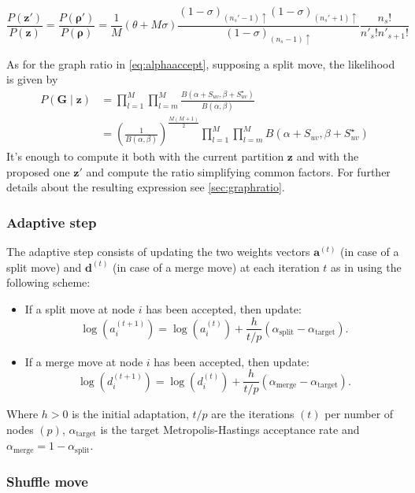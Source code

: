 \begin{equation*}
    \frac{P(\bm{z}')}{P(\bm{z})}
    =
    \frac{P(\bm{\rho}')}{P(\bm{\rho})}
    =
    \frac{1}{M}(\theta+M\sigma)\frac{(1-\sigma)_{(n_{s}'-1)\uparrow}(1-\sigma)_{(n_{s}'+1)\uparrow}}{(1-\sigma)_{(n_{s}-1)\uparrow}}\frac{n_{s}!}{n'_{s}!n'_{s+1}!}
\end{equation*}


As for the graph ratio in \eqref{eq:alphaaccept}, supposing a split move, the likelihood is given by
\begin{align*}
    P(\bm{G}\mid \bm{z}) &= \prod_{l=1}^M \prod_{l=m}^M \frac{B(\alpha+S_{uv},\beta+S^{\star}_{uv})}{B(\alpha,\beta)} \\
    &= \left(\frac{1}{B(\alpha,\beta)}\right)^\frac{M(M+1)}{2}\prod_{l=1}^M \prod_{l=m}^M B(\alpha+S_{uv},\beta+S^{\star}_{uv})
\end{align*}
It's enough to compute it both with the current partition $\bm{z}$ and with the proposed one $\bm{z}'$ and compute the ratio simplifying common factors. For further details about the resulting expression see \ref{sec:graphratio}.

\subsubsection{Adaptive step}

The adaptive step consists of updating the two weights vectors $\bm{a}^{(t)}$ (in case of a split move) and $\bm{d}^{(t)}$ (in case of a merge move) at each iteration $t$ as in \textcite{bensonAdaptiveMCMCMultiple2018} using the following scheme:
    \begin{itemize}
        \item If a split move at node $i$ has been accepted, then update:
        \[
            \log (a_i^{(t+1)})=\log (a_i^{(t)})+\frac{h}{t/p}(\alpha_{\text{split}}-\alpha_{\text{target}}) .
        \]
        \item If a merge move at node $i$ has been accepted, then update:
        \[
            \log (d_i^{(t+1)})=\log (d_i^{(t)})+\frac{h}{t/p}(\alpha_{\text{merge}}-\alpha_{\text{target}}) .
        \]
    \end{itemize}

Where $h>0$ is the initial adaptation, $t/p$ are the iterations $(t)$ per number of nodes $(p)$, $\alpha_{\text{target}}$ is the target Metropolis-Hastings acceptance rate and $\alpha_{\text{merge}} = 1 - \alpha_{\text{split}}$.


\subsubsection{Shuffle move}

